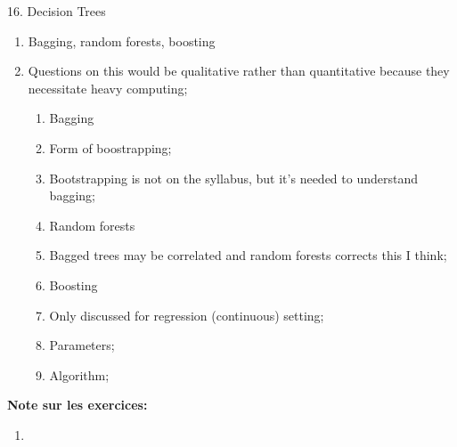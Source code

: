 \documentclass[12pt, titlepage, french]{report}
\begin{document}
\begin{CHPT_SUMM}{16. Decision Trees}
\begin{enumerate}
\begin{itemize}
\begin{itemize}
			\item	\textit{cost complexity pruning} oro \textit{weakest link pruning};
			\item	Tuning parameter $\alpha$;
			\item	Cost of tree is $\alpha$ per terminal node;
			\item	For each value of $\alpha$ we prune the tree to minimize <> and select optimal tree with cross-validation;
			\item	higher $\alpha$ => smaller tree
		\end{itemize}
		\item	To optimise a \textbf{classification} tree, we minimize the classification error rate instead of the MSE;
		\item	The classification error rate is not sufficiently sensitive to grow the tree so we use the \textbf{Gini index} or the \textbf{cross-entropy} instead;		
		\item	Note on measure to use for pruning;
		\item	Residual mean deviance;
		\item	Advantages over linear models
		\item	Shortcomings;
	\end{itemize}
	\item	Bagging, random forests, boosting
	\item[]	Questions on this would be qualitative rather than quantitative because they necessitate heavy computing;
	\begin{enumerate}
		\item	Bagging	
		\item[]	Form of boostrapping;
		\item[]	Bootstrapping is not on the syllabus, but it's needed to understand bagging;
		\item	Random forests
		\item[]	Bagged trees may be correlated and random forests corrects this I think;
		\item	Boosting
		\item[]	Only discussed for regression (continuous) setting;
		\item[]	Parameters;
		\item[]	Algorithm;
	\end{enumerate}
\end{enumerate}
\textbf{Note sur les exercices:} 
\begin{enumerate}
	\item	
\end{enumerate}
\end{CHPT_SUMM}
\end{document}
